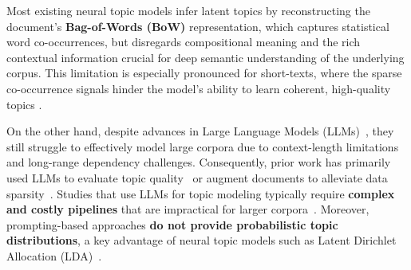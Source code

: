 \documentclass{article}
\theoremstyle{plain}
\theoremstyle{definition}
\theoremstyle{remark}
\begin{document}
Most existing neural topic models \citep{miao2017discovering, srivastava2017autoencoding, bianchi-etal-2021-pre, dieng-etal-2020-topic} infer latent topics by reconstructing the document's \textbf{Bag-of-Words (BoW)} representation, which captures statistical word co-occurrences, but disregards 
compositional meaning and the rich contextual information crucial for deep semantic understanding of the underlying corpus. This limitation is especially pronounced for short-texts, where the sparse co-occurrence signals hinder the model's ability to learn coherent, high-quality topics \citep{qiang2020short}.





On the other hand, despite advances in Large Language Models (LLMs)~\citep{brown2020language, touvron2023llama, touvron2023llama2, grattafiori2024llama}, they still struggle to effectively model large corpora due to context-length limitations and long-range dependency challenges.
Consequently, prior work has primarily used LLMs to evaluate topic quality~\citep{stammbach-etal-2023-revisiting, rahimi-etal-2024-contextualized} or augment documents to alleviate data sparsity~\citep{akash-chang-2024-enhancing}.
Studies that use LLMs for topic modeling typically require \textbf{complex and costly pipelines} that are impractical for larger corpora~\citep{mu-etal-2024-beyond, pham-etal-2024-topicgpt, yang-etal-2025-neural}. 
Moreover, prompting-based approaches \textbf{do not provide probabilistic topic distributions}, a key advantage of neural topic models such as Latent Dirichlet Allocation (LDA)~\citep{blei2003latent}.
\end{document}
